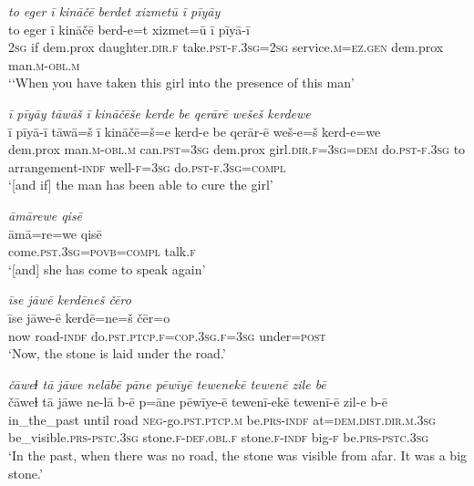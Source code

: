 \ea \label{ZP.44}
\textit{to eger ī kināčē berdet xizmetū ī pīyāy} \\ 
\gll to eger ī kināčē berd-e=t xizmet=ū ī pīyā-ī \\ 
 \textsc{2sg} if dem.prox daughter\textsc{.dir}\textsc{.f} take\textsc{.pst}\textsc{-f}\textsc{.3sg}\textsc{=\textsc{2sg}} service\textsc{.m}\textsc{\textsc{=ez.gen}} dem.prox man\textsc{.m}\textsc{-obl}\textsc{.m} \\ 
\glt `‘When you have taken this girl into the presence of this man'
\z 
 
\ea \label{ZP.45}
\textit{ī pīyāy tāwāš ī kināčēše kerde be qerārē wešeš kerdewe} \\ 
\gll ī pīyā-ī tāwā=š ī kināčē=š=e kerd-e be qerār-ē weš-e=š kerd-e=we \\ 
 dem.prox man\textsc{.m}\textsc{-obl}\textsc{.m} can\textsc{.pst}\textsc{=3sg} dem.prox girl\textsc{.dir}\textsc{.f}\textsc{=3sg}\textsc{=dem} do\textsc{.pst}\textsc{-f}\textsc{.3sg} to arrangement\textsc{-indf} well\textsc{-f}\textsc{=3sg} do\textsc{.pst}\textsc{-f}\textsc{.3sg}\textsc{=compl} \\ 
\glt `[and if] the man has been able to cure the girl'
\z 
 
\ea \label{ZP.46}
\textit{āmārewe qisē} \\ 
\gll āmā=re=we qisē \\ 
 come\textsc{.pst}\textsc{.3sg}\textsc{=\textsc{povb}}\textsc{=\textsc{compl}} talk\textsc{.f} \\ 
\glt `[and] she has come to speak again'
\z 
 
\ea \label{ZP.53}
\textit{īse jāwē kerdēneš čēro} \\ 
\gll īse jāwe-ē kerdē=ne=š čēr=o \\ 
 now road\textsc{-indf} do\textsc{.pst}\textsc{.ptcp}\textsc{.f}\textsc{=cop}\textsc{.3sg}\textsc{.f}\textsc{=3sg} under\textsc{=\textsc{post}} \\ 
\glt `Now, the stone is laid under the road.'
\z 
 
\ea \label{ZP.54}
\textit{čāweɫ tā jāwe nelābē pāne pēwīyē tewenekē tewenē zile bē} \\ 
\gll čāweɫ tā jāwe ne-lā b-ē p=āne pēwīye-ē tewenī-ekē tewenī-ē zil-e b-ē \\ 
 in\_the\_past until road \textsc{neg-}go\textsc{.pst}\textsc{.ptcp}\textsc{.m} be\textsc{.prs}\textsc{-indf} at=\textsc{dem.dist}\textsc{.dir}\textsc{.m}\textsc{.3sg} be\_visible\textsc{.prs}\textsc{-pstc}\textsc{.3sg} stone\textsc{.f}\textsc{-def}\textsc{.obl}\textsc{.f} stone\textsc{.f}\textsc{-indf} big\textsc{-f} be\textsc{.prs}\textsc{-pstc}\textsc{.3sg} \\ 
\glt `In the past, when there was no road, the stone was visible from afar. It was a big stone.'
\z 
 
